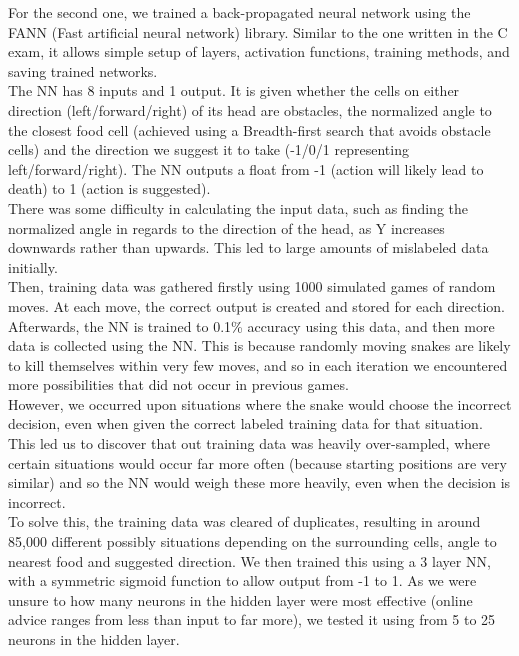 \documentclass{article}
\begin{document}
For the second one, we trained a back-propagated neural network using the FANN (Fast artificial neural network) library. Similar to the one written in the C exam, it allows simple setup of layers, activation functions, training methods, and saving trained networks.\\
The NN has 8 inputs and 1 output. It is given whether the cells on either direction (left/forward/right) of its head are obstacles, the normalized angle to the closest food cell (achieved using a Breadth-first search that avoids obstacle cells) and the direction we suggest it to take (-1/0/1 representing left/forward/right). The NN outputs a float from -1 (action will likely lead to death) to 1 (action is suggested).\\

There was some difficulty in calculating the input data, such as finding the normalized angle in regards to the direction of the head, as Y increases downwards rather than upwards. This led to large amounts of mislabeled data initially.\\

Then, training data was gathered firstly using 1000 simulated games of random moves. At each move, the correct output is created and stored for each direction. Afterwards, the NN is trained to 0.1\% accuracy using this data, and then more data is collected using the NN. This is because randomly moving snakes are likely to kill themselves within very few moves, and so in each iteration we encountered more possibilities that did not occur in previous games.\\

However, we occurred upon situations where the snake would choose the incorrect decision, even when given the correct labeled training data for that situation. This led us to discover that out training data was heavily over-sampled, where certain situations would occur far more often (because starting positions are very similar) and so the NN would weigh these more heavily, even when the decision is incorrect.\\

To solve this, the training data was cleared of duplicates, resulting in around 85,000 different possibly situations depending on the surrounding cells, angle to nearest food and suggested direction. We then trained this using a 3 layer NN, with a symmetric sigmoid function to allow output from -1 to 1. As we were unsure to how many neurons in the hidden layer were most effective (online advice ranges from less than input to far more), we tested it using from 5 to 25 neurons in the hidden layer.\\
\end{document}
